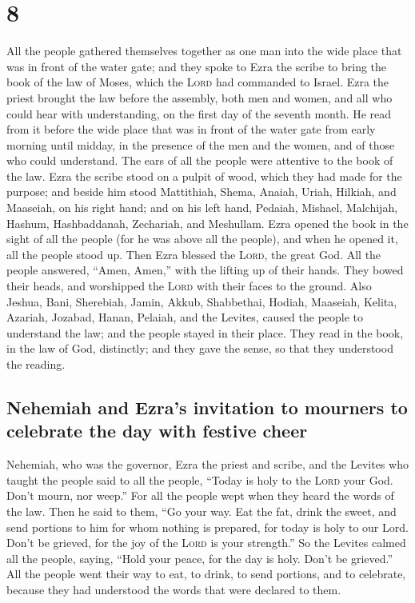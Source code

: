 \hypertarget{section-7}{%
\section{8}\label{section-7}}

 All the people gathered themselves together as one man
into the wide place that was in front of the water gate; and they spoke
to Ezra the scribe to bring the book of the law of Moses, which the
\textsc{Lord} had commanded to Israel.  Ezra the priest
brought the law before the assembly, both men and women, and all who
could hear with understanding, on the first day of the seventh month.
 He read from it before the wide place that was in front
of the water gate from early morning until midday, in the presence of
the men and the women, and of those who could understand. The ears of
all the people were attentive to the book of the law. 
Ezra the scribe stood on a pulpit of wood, which they had made for the
purpose; and beside him stood Mattithiah, Shema, Anaiah, Uriah, Hilkiah,
and Maaseiah, on his right hand; and on his left hand, Pedaiah, Mishael,
Malchijah, Hashum, Hashbaddanah, Zechariah, and Meshullam.
 Ezra opened the book in the sight of all the people (for
he was above all the people), and when he opened it, all the people
stood up.  Then Ezra blessed the \textsc{Lord}, the great
God. All the people answered, ``Amen, Amen,'' with the lifting up of
their hands. They bowed their heads, and worshipped the \textsc{Lord}
with their faces to the ground.  Also Jeshua, Bani,
Sherebiah, Jamin, Akkub, Shabbethai, Hodiah, Maaseiah, Kelita, Azariah,
Jozabad, Hanan, Pelaiah, and the Levites, caused the people to
understand the law; and the people stayed in their place. 
They read in the book, in the law of God, distinctly; and they gave the
sense, so that they understood the reading.

\hypertarget{nehemiah-and-ezras-invitation-to-mourners-to-celebrate-the-day-with-festive-cheer}{%
\subsection{Nehemiah and Ezra's invitation to mourners to celebrate the
day with festive
cheer}\label{nehemiah-and-ezras-invitation-to-mourners-to-celebrate-the-day-with-festive-cheer}}

 Nehemiah, who was the governor, Ezra the priest and
scribe, and the Levites who taught the people said to all the people,
``Today is holy to the \textsc{Lord} your God. Don't mourn, nor weep.''
For all the people wept when they heard the words of the law.
 Then he said to them, ``Go your way. Eat the fat, drink
the sweet, and send portions to him for whom nothing is prepared, for
today is holy to our Lord. Don't be grieved, for the joy of the
\textsc{Lord} is your strength.''  So the Levites calmed
all the people, saying, ``Hold your peace, for the day is holy. Don't be
grieved.''  All the people went their way to eat, to
drink, to send portions, and to celebrate, because they had understood
the words that were declared to them.

